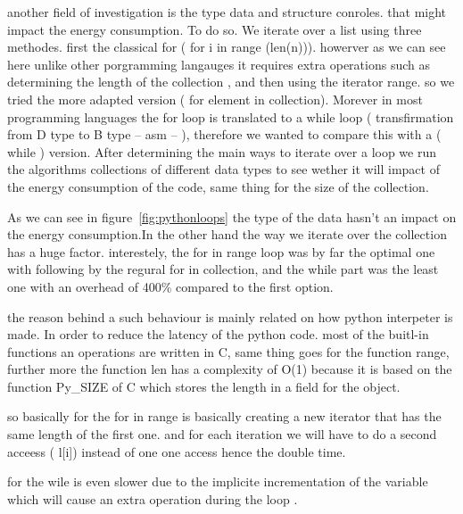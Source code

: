 


another field of investigation is the type data and structure conroles. that might impact the energy consumption.
To do so. We iterate over a list using three methodes.
first the classical for ( for i in range (len(n))). howerver as we can see here unlike other porgramming langauges it requires extra operations such as determining the length of the collection , and then using the iterator range. so we tried the more adapted version
( for element in collection). Morever in most programming languages the for loop is translated to a while loop ( transfirmation from D type to B type -- asm -- ), therefore we wanted to compare this with a ( while ) version.
After determining the main ways to iterate over a loop we run the algorithms  collections of different data types to see wether it will impact of the energy consumption of the code, same thing for the size of the collection.

As we can see in figure~\ref{fig:pythonloops} the type of the data hasn't an impact on the energy consumption.In the other hand the way we iterate over the collection has a huge factor. interestely, the for in range loop was by far the optimal one with following by the regural for in collection, and the while part was the least one with an overhead of 400\% compared to the first option.



the reason behind a such behaviour is mainly related on how python interpeter is made.
In order to reduce the latency of the python code. most of the buitl-in functions an operations are written in C, same thing goes for the function range, further more the function len has a complexity of O(1) because it is based on the function Py\_SIZE  of C which stores the length in a field for the object.

so basically for the for in range is basically creating a new iterator that has the same length of the first one. and for each iteration we will have to do a second acceess ( l[i]) instead of one one access hence the double time.

for the wile is even slower due to the implicite incrementation of the variable which will cause an extra operation during the loop .

